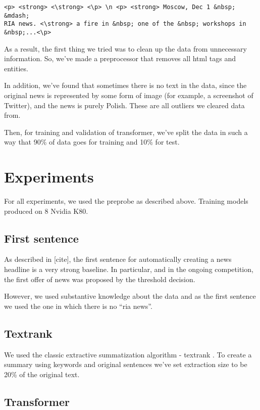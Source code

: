 \documentclass{dialogue}
\begin{document}
\begin{verbatim}
<p> <strong> <\strong> <\p> \n <p> <strong> Moscow, Dec 1 &nbsp; &mdash;
RIA news. <\strong> a fire in &nbsp; one of the &nbsp; workshops in
&nbsp;...<\p>
\end{verbatim}

As a result, the first thing we tried was to clean up the data from unnecessary information. So, we've made a preprocessor that removes all html tags and entities.

In addition, we've found that sometimes there is no text in the data, since the original news is represented by some form of image (for example, a screenshot of Twitter), and the news is purely Polish. These are all outliers we cleared data from.

Then, for training and validation of transformer, we've split the data in such a way that 90\% of data goes for training and 10\% for test.

\section{Experiments}
For all experiments, we used the preprobe as described above. Training models produced on 8 Nvidia K80.

\subsection{First sentence}

As described in [cite], the first sentence for automatically creating a news headline is a very strong baseline. In particular, and in the ongoing competition, the first offer of news was proposed by the threshold decision.

However, we used substantive knowledge about the data and as the first sentence we used the one in which there is no “ria news”.

\subsection{Textrank}

We used the classic extractive summatization algorithm - textrank \cite{DBLP:journals/corr/BarriosLAW16}. To create a summary using keywords and original sentences we've set extraction size to be 20\% of the original text.

\subsection{Transformer}
\end{document}
